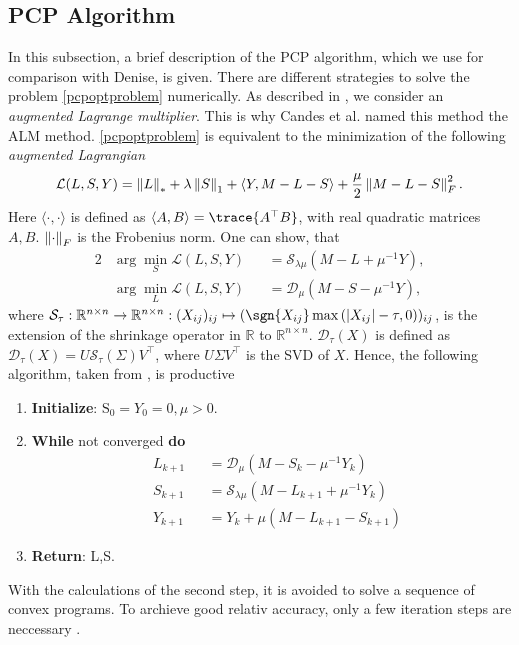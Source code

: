 \subsection{PCP Algorithm}
\label{sec:PCP}
In this subsection, a brief description of the PCP algorithm, which we use for comparison with Denise, is given. There are different strategies to solve the problem \eqref{pcpoptproblem} numerically. As described in \cite{candes2009robust}, we consider an \textit{augmented Lagrange multiplier}. This is why Candes et al. named this method the ALM method. \eqref{pcpoptproblem} is equivalent to the minimization of the following \textit{augmented Lagrangian}
\begin{align}
 \mathcal L(L,S,Y) = \left\Vert L\right\Vert_* + \lambda \left\Vert S\right\Vert_1 + \langle Y, M -L - S \rangle + \dfrac{\mu}{2} \left\Vert M - L - S\right\Vert_F^2.
\end{align}
Here $\langle \cdot, \cdot \rangle$ is defined as $\langle A , B \rangle = \trace{A^\top B}$, with real quadratic matrices $A,B$. $\left\Vert\cdot\right\Vert_F$ is the Frobenius norm. One can show, that
\begin{alignat}{2}
 &\arg \min_S \mathcal L(L,S,Y) &&= \mathcal S_{\lambda \mu}(M-L+ \mu^{-1} Y), \\
 &\arg \min_L \mathcal L(L,S,Y) &&= \mathcal D_\mu (M-S-\mu^{-1} Y),
\end{alignat}
where $\mathcal S_\tau : \mathbb R^{n \times n} \to \mathbb R^{n \times n}: (X_{ij})_{ij} \mapsto (\sgn{X_{ij}} \max \left( \abs{X_{ij}} - \tau,0 \right))_{ij}$, is the extension of the shrinkage operator in $\mathbb R$ to $\mathbb R^{n \times n}$. $\mathcal D_\tau (X)$ is defined as $\mathcal D_\tau (X) = U \mathcal S_\tau (\Sigma) V^\top$, where $U \Sigma V^\top$ is the SVD of $X$. Hence, the following algorithm, taken from \cite[29]{candes2009robust}, is productive
\begin{enumerate}
 \item \textbf{Initialize}: $\mathrm S_0 = Y_0 = 0,\mu >0$.
 \item \textbf{While} not converged \textbf{do}
    \begin{subequations}
    \begin{alignat}{2}
     &L_{k+1} &&= \mathcal D_\mu(M-S_k-\mu^{-1} Y_k) \\
     &S_{k+1} &&= \mathcal S_{\lambda \mu}(M-L_{k+1} +\mu^{-1} Y_k) \\
     &Y_{k+1} &&= Y_k + \mu(M-L_{k+1} - S_{k+1})
    \end{alignat}
    \end{subequations}
 \item \textbf{Return}: L,S.
\end{enumerate}
With the calculations of the second step, it is avoided to solve a sequence of convex programs. To archieve good relativ accuracy, only a few iteration steps are neccessary \cite[section 3]{candes2009robust}.


